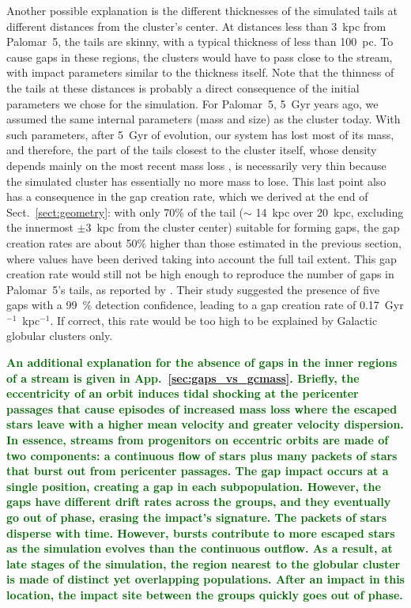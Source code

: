\documentclass{aa}
\newcommand{\salvatore}[1]{\textcolor{darkgreen}{{#1}}}
\begin{document}
    Another possible explanation is the different thicknesses of the simulated tails at different distances from the cluster's center. At distances less than 3~kpc from Palomar~5, the tails are skinny, with a typical thickness of less than 100~pc. To cause gaps in these regions, the clusters would have to pass close to the stream, with impact parameters similar to the thickness itself. Note that the thinness of the tails at these distances is probably a direct consequence of the initial parameters we chose for the simulation. For Palomar~5, 5~Gyr years ago, we assumed the same internal parameters (mass and size) as the cluster today. With such parameters, after 5~Gyr of evolution, our system has lost most of its mass, and therefore, the part of the tails closest to the cluster itself, whose density depends mainly on the most recent mass loss \citep[see, for example, Fig.~A.3 in][]{2012A&A...546L...7M}, is necessarily very thin because the simulated cluster has essentially no more mass to lose. This last point also has a consequence in the gap creation rate, which we derived at the end of Sect.~\ref{sect:geometry}: with only 70\% of the tail  ($\sim$ 14~kpc over 20~kpc, excluding the innermost $\pm 3$~kpc from the cluster center) suitable for forming gaps, the gap creation rates are about 50$\%$ higher than those estimated in the previous section, where values have been derived taking into account the full tail extent. This gap creation rate would still not be high enough to reproduce the number of gaps in Palomar~5's tails, as reported by \citet{2012ApJ...760...75C}. Their study suggested the presence of five gaps with a 99~\% detection confidence, leading to a gap creation rate of 0.17~Gyr$^{-1}$~kpc$^{-1}$. If correct, this rate would be too high to be explained by Galactic globular clusters only. 

\textbf{\salvatore{An additional explanation for the absence of gaps in the inner regions of a stream is given in App.~\ref{sec:gaps_vs_gcmass}. Briefly, the eccentricity of an orbit induces tidal shocking at the pericenter passages that cause episodes of increased mass loss where the escaped stars leave with a higher mean velocity and greater velocity dispersion. In essence, streams from progenitors on eccentric orbits are made of two components: a continuous flow of stars plus many packets of stars that burst out from pericenter passages. The gap impact occurs at a single position, creating a gap in each subpopulation. However, the gaps have different drift rates across the groups, and they eventually go out of phase, erasing the impact's signature. The packets of stars disperse with time. However, bursts contribute to more escaped stars as the simulation evolves than the continuous outflow. As a result, at late stages of the simulation, the region nearest to the globular cluster is made of distinct yet overlapping populations. After an impact in this location, the impact site between the groups quickly goes out of phase. }}
\end{document}
